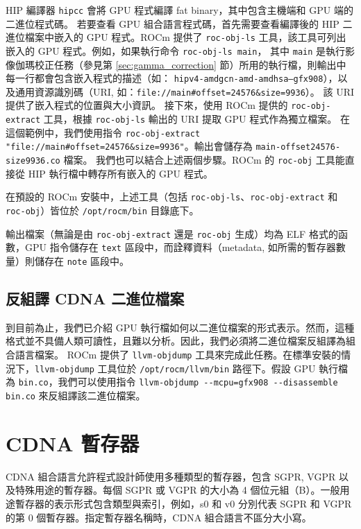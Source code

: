 HIP 編譯器 \lstinline|hipcc| 會將 GPU 程式編譯 fat binary，其中包含主機端和 GPU 端的二進位程式碼。
若要查看 GPU 組合語言程式碼，首先需要查看編譯後的 HIP 二進位檔案中嵌入的 GPU 程式。ROCm 提供了 \lstinline|roc-obj-ls| 工具，該工具可列出嵌入的 GPU 程式。例如，如果執行命令 \lstinline|roc-obj-ls main|，
其中 \lstinline|main| 是執行影像伽瑪校正任務（參見第 \ref{sec:gamma_correction} 節）所用的執行檔，則輸出中每一行都會包含嵌入程式的描述（如： \lstinline|hipv4-amdgcn-amd-amdhsa–gfx908|），以及通用資源識別碼（URI, 如：\lstinline|file://main#offset=24576&size=9936|）。
該 URI 提供了嵌入程式的位置與大小資訊。
接下來，使用 ROCm 提供的 \lstinline|roc-obj-extract| 工具，根據 \lstinline|roc-obj-ls| 輸出的 URI 提取 GPU 程式作為獨立檔案。
在這個範例中，我們使用指令 \lstinline|roc-obj-extract "file://main#offset=24576&size=9936"|。輸出會儲存為 \lstinline|main-offset24576-size9936.co| 檔案。
我們也可以結合上述兩個步驟。ROCm 的 \lstinline|roc-obj| 工具能直接從 HIP 執行檔中轉存所有嵌入的 GPU 程式。

在預設的 ROCm 安裝中，上述工具（包括 \lstinline|roc-obj-ls|、\lstinline|roc-obj-extract| 和 \lstinline|roc-obj|）皆位於 \lstinline|/opt/rocm/bin| 目錄底下。

輸出檔案（無論是由 \lstinline|roc-obj-extract| 還是 \lstinline|roc-obj| 生成）均為 ELF 格式的函數，GPU 指令儲存在 \lstinline|text| 區段中，而詮釋資料（metadata, 如所需的暫存器數量）則儲存在 \lstinline|note| 區段中。


\subsection{反組譯 CDNA 二進位檔案}

到目前為止，我們已介紹 GPU 執行檔如何以二進位檔案的形式表示。然而，這種格式並不具備人類可讀性，且難以分析。因此，我們必須將二進位檔案反組譯為組合語言檔案。
ROCm 提供了 \lstinline|llvm-objdump| 工具來完成此任務。在標準安裝的情況下，\lstinline|llvm-objdump| 工具位於 \lstinline|/opt/rocm/llvm/bin| 路徑下。假設 GPU 執行檔為 \lstinline|bin.co|，我們可以使用指令 \lstinline|llvm-objdump --mcpu=gfx908 --disassemble bin.co| 來反組譯該二進位檔案。


\section{CDNA 暫存器}

CDNA 組合語言允許程式設計師使用多種類型的暫存器，包含 SGPR, VGPR 以及特殊用途的暫存器。每個 SGPR 或 VGPR 的大小為 4 個位元組（B）。一般用途暫存器的表示形式包含類型與索引，例如，s0 和 v0 分別代表 SGPR 和 VGPR 的第 0 個暫存器。指定暫存器名稱時，CDNA 組合語言不區分大小寫。

